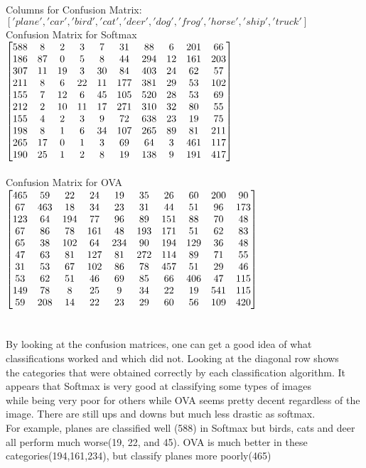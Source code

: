 \documentclass[12pt]{article}
\begin{document}
Columns for Confusion Matrix:\\
$['plane', 'car', 'bird', 'cat', 'deer', 'dog', 'frog', 'horse', 'ship', 'truck']$\\
Confusion Matrix for Softmax\\
$\begin{bmatrix}
588 & 8 & 2 & 3 & 7&  31&  88&   6& 201&  66\\
186&  87 &  0 &  5  & 8 & 44 &294&  12& 161& 203\\
307&  11&  19 &  3 & 30 & 84& 403&  24 & 62&  57\\
211&   8 &  6 & 22 & 11 &177& 381&  29 & 53& 102\\
155&   7 &12 &  6 &45 &105& 520&  28 & 53&  69\\
212&   2 & 10 & 11& 17 &271& 310&  32&  80&  55\\
155&   4 &  2 & 3  & 9  &72 &638 & 23 & 19 & 75\\
198&   8 &  1  & 6 & 34 &107& 265&  89&  81& 211\\
265&  17 &  0  & 1 &  3  &69 & 64 & 3& 461&117\\
190&  25&   1  & 2 &  8  &19& 138 &  9& 191& 417
\end{bmatrix}\\$
\\
\\
Confusion Matrix for OVA
$\begin{bmatrix}
465&59&22&24&19&35&26&60&200&90\\
67&463&18&34&23&31&44&51&96&173\\
123&64&194&77&96&89&151&88&70&48\\
67&86&78&161&48&193&171&51&62&83\\
65&38&102&64&234&90&194&129&36&48\\
47&63&81&127&81&272&114&89&71&55\\
31&53&67&102&86&78&457&51&29&46\\
53&62&51&46&69&85&66&406&47&115\\
149&78&8&25&9&34&22&19&541&115\\
59&208&14&22&23&29&60&56&109&420\\
\end{bmatrix}\\$
\\
\\
\\
By looking at the confusion matrices, one can get a good idea of what classifications worked and which did not. Looking at the diagonal row shows\\
the categories that were obtained correctly by each classification algorithm. It appears that Softmax is very good at classifying some types of images\\
while being very poor for others while OVA seems pretty decent regardless of the image. There are still ups and downs but much less drastic as softmax.\\
For example, planes are classified well (588) in Softmax but birds, cats and deer all perform much worse(19, 22, and 45). OVA is much better in these categories(194,161,234), but classify planes more poorly(465)
\end{document}
